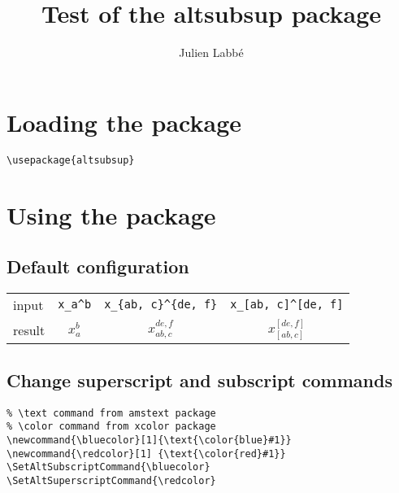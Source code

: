 \documentclass{article}
\title{Test of the \textsf{altsubsup} package}
\author{Julien Labb\'e}
\begin{document}
\maketitle

\renewcommand{\arraystretch}{1.5}

\section{Loading the package}

\begin{verbatim}
\usepackage{altsubsup}
\end{verbatim}

\section{Using the package}

\subsection{Default configuration}

\begin{center}
  \begin{tabular}{lccc}
    \hline
    input & \verb|x_a^b| & \verb|x_{ab, c}^{de, f}|   & \verb|x_[ab, c]^[de, f]| \\
    result & $x_a^b$ & $x_{ab, c}^{de, f}$  & $x_[ab, c]^[de, f]$ \\
    \hline
  \end{tabular}
\end{center}

\subsection{Change superscript and subscript commands}

\begin{verbatim}
% \text command from amstext package
% \color command from xcolor package
\newcommand{\bluecolor}[1]{\text{\color{blue}#1}}
\newcommand{\redcolor}[1] {\text{\color{red}#1}}
\SetAltSubscriptCommand{\bluecolor}
\SetAltSuperscriptCommand{\redcolor}
\end{verbatim}

\newcommand{\bluecolor}[1]{\text{\color{blue}#1}}
\newcommand{\redcolor}[1] {\text{\color{red}#1}}
\SetAltSubscriptCommand{\bluecolor}
\SetAltSuperscriptCommand{\redcolor}
\end{document}
